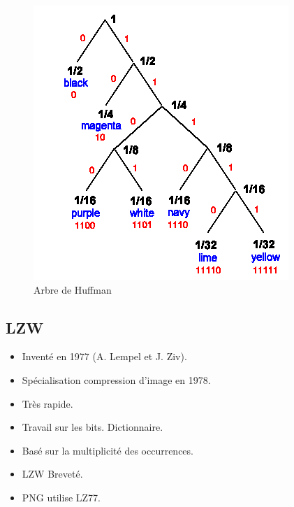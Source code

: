 \documentclass[14pt]{beamer}
\begin{document}
\begin{frame}{\subsecname}
\begin{figure}
\centering
\includegraphics[height=0.7\textheight]{image_huffman}
\caption{Arbre de Huffman}
\end{figure}
\end{frame}



\subsection{LZW}
\begin{frame}{\subsecname}
\begin{itemize}
\item Inventé en 1977 (A. Lempel et J. Ziv).
\item Spécialisation compression d'image en 1978.
\item Très rapide.
\item Travail sur les bits. Dictionnaire.
\item Basé sur la multiplicité des occurrences.
\item LZW Breveté.
\item PNG utilise LZ77.
\end{itemize}

\end{frame}
\end{document}

